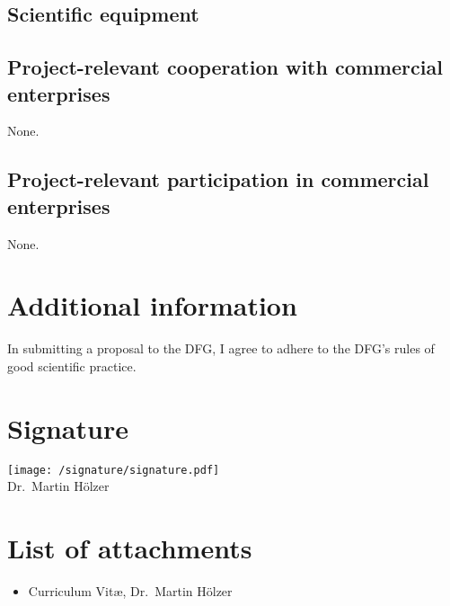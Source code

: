 \documentclass{scrartcl}
\begin{document}
\subsection{Scientific equipment}

\subsection{Project-relevant cooperation with commercial enterprises}
None.

\subsection{Project-relevant participation in commercial enterprises}
None.

\section{Additional information}
In submitting a proposal to the DFG, I agree to adhere to the DFG's rules of
good scientific practice.

\section{Signature}

\texttt{[image: /signature/signature.pdf]}\\
Dr.\ Martin H\"olzer

\section{List of attachments}
\begin{itemize}
  \item Curriculum Vit\ae, Dr.\ Martin H\"olzer
\end{itemize}
\end{document}
